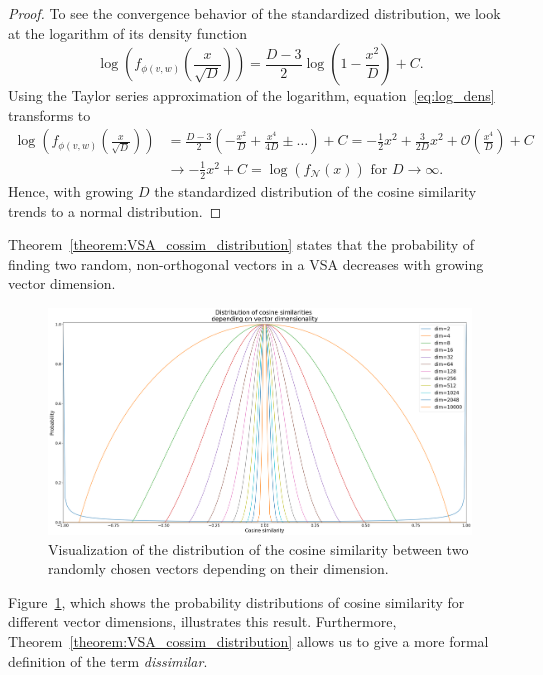 \begin{proof}
	To see the convergence behavior of the standardized distribution, we look at the logarithm of its density function %
	\begin{equation}
	\label{eq:log_dens}
	\log\left(f_{\phi(v,w)}\left(\frac{x}{\sqrt{D}}\right)\right) = \frac{D-3}{2}\log\left(1-\frac{x^2}{D}\right) + C.
	\end{equation}
	Using the Taylor series approximation of the logarithm, equation~\eqref{eq:log_dens} transforms to
	\begin{align*}
		\log\left(f_{\phi(v,w)}\left(\frac{x}{\sqrt{D}}\right)\right) &= \frac{D-3}{2}\left(-\frac{x^2}{D} + \frac{x^4}{4D} \pm \ldots \right) + C = -\frac{1}{2}x^2 + \frac{3}{2D}x^2 + \mathcal{O}\left(\frac{x^4}{D}\right)  + C  \\
		&\longrightarrow -\frac{1}{2}x^2 + C = \log\left(f_{\mathcal{N}}\left(x\right)\right) \textrm{ for } D \longrightarrow \infty.
	\end{align*}
	Hence, with growing $D$ the standardized distribution of the cosine similarity trends to a normal distribution.
\end{proof}
Theorem~\ref{theorem:VSA_cossim_distribution} states that the probability of finding two random, non-orthogonal vectors in a \ac{VSA} decreases with growing vector dimension.
\begin{figure}[t]
    \centering
    \includegraphics[width=1.\linewidth]{imgs/distributions_cosine_sims.eps}
    \caption{Visualization of the distribution of the cosine similarity between two randomly chosen vectors depending on their dimension.}
    \label{fig:distributions_cosine_sims}
\end{figure}
Figure~\ref{fig:distributions_cosine_sims}, which shows the probability distributions of cosine similarity for different vector dimensions, illustrates this result.
Furthermore, Theorem~\ref{theorem:VSA_cossim_distribution} allows us to give a more formal definition of the term \emph{dissimilar}.
